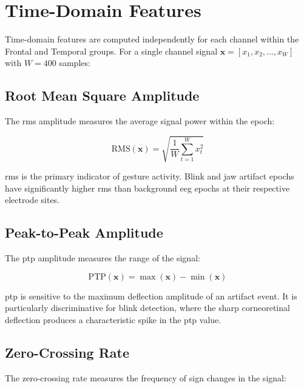 \section{Time-Domain Features}
\label{sec:fe_time}

Time-domain features are computed independently for each
channel within the Frontal and Temporal groups. For a single
channel signal $\mathbf{x} = [x_1, x_2, \ldots, x_W]$ with
$W = 400$ samples:

\subsection{Root Mean Square Amplitude}

The \acrfull{rms} amplitude measures the average signal power
within the epoch:

\begin{equation}
\text{RMS}(\mathbf{x}) = \sqrt{\frac{1}{W}
\sum_{t=1}^{W} x_t^2}
\label{eq:rms}
\end{equation}

\acrshort{rms} is the primary indicator of gesture activity.
Blink and jaw artifact epochs have significantly higher
\acrshort{rms} than background \acrshort{eeg} epochs at
their respective electrode sites.

\subsection{Peak-to-Peak Amplitude}

The \acrfull{ptp} amplitude measures the range of the signal:

\begin{equation}
\text{PTP}(\mathbf{x}) = \max(\mathbf{x}) - \min(\mathbf{x})
\label{eq:ptp}
\end{equation}

\acrshort{ptp} is sensitive to the maximum deflection
amplitude of an artifact event. It is particularly
discriminative for blink detection, where the sharp
corneoretinal deflection produces a characteristic spike
in the \acrshort{ptp} value.

\subsection{Zero-Crossing Rate}

The zero-crossing rate measures the frequency of sign changes
in the signal:

